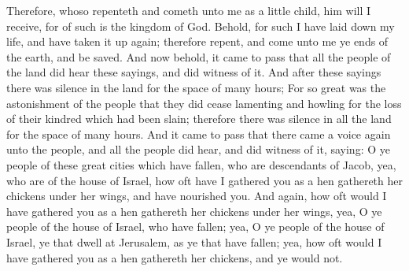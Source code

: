 Therefore, whoso repenteth and cometh unto me as a little child, him will I receive, for of such is the kingdom of God.  Behold, for such I have laid down my life, and have taken it up again; therefore repent, and come unto me ye ends of the earth, and be saved.
\bchapter
\bverse \iffalse And now behold, it came to pass that all the people of the land did hear these sayings, and did witness of it. And after these sayings there was silence in the land for the space of many hours; \fi
And now behold, it came to pass that all the people of the land did hear these sayings, and did witness of it. And after these sayings there was silence in the land for the space of many hours;
\bverse \iffalse For so great was the astonishment of the people that they did cease lamenting and howling for the loss of their kindred which had been slain; therefore there was silence in all the land for the space of many hours. \fi
For so great was the astonishment of the people that they did cease lamenting and howling for the loss of their kindred which had been slain; therefore there was silence in all the land for the space of many hours.
\bverse \iffalse And it came to pass that there came a voice again unto the people, and all the people did hear, and did witness of it, saying: \fi
And it came to pass that there came a voice again unto the people, and all the people did hear, and did witness of it, saying:
\bverse \iffalse O ye people of these great cities which have fallen, who are descendants of Jacob, yea, who are of the house of Israel, how oft have I gathered you as a hen gathereth her chickens under her wings, and have nourished you. \fi
O ye people of these great cities which have fallen, who are descendants of Jacob, yea, who are of the house of Israel, how oft have I gathered you as a hen gathereth her chickens under her wings, and have nourished you.
\bverse \iffalse And again, how oft would I have gathered you as a hen gathereth her chickens under her wings, yea, O ye people of the house of Israel, who have fallen; yea, O ye people of the house of Israel, ye that dwell at Jerusalem, as ye that have fallen; yea, how oft would I have gathered you as a hen gathereth her chickens, and ye would not. \fi
And again, how oft would I have gathered you as a hen gathereth her chickens under her wings, yea, O ye people of the house of Israel, who have fallen; yea, O ye people of the house of Israel, ye that dwell at Jerusalem, as ye that have fallen; yea, how oft would I have gathered you as a hen gathereth her chickens, and ye would not.
